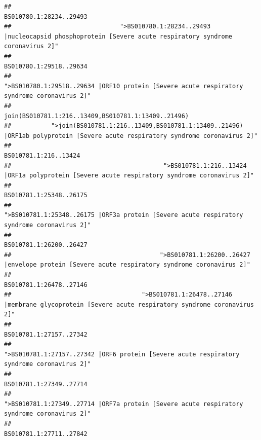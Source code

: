 \documentclass[
]{article}
\begin{document}
\begin{verbatim}
##                                                                                                                BS010780.1:28234..29493 
##                              ">BS010780.1:28234..29493 |nucleocapsid phosphoprotein [Severe acute respiratory syndrome coronavirus 2]" 
##                                                                                                                BS010780.1:29518..29634 
##                                            ">BS010780.1:29518..29634 |ORF10 protein [Severe acute respiratory syndrome coronavirus 2]" 
##                                                                                    join(BS010781.1:216..13409,BS010781.1:13409..21496) 
##           ">join(BS010781.1:216..13409,BS010781.1:13409..21496) |ORF1ab polyprotein [Severe acute respiratory syndrome coronavirus 2]" 
##                                                                                                                  BS010781.1:216..13424 
##                                          ">BS010781.1:216..13424 |ORF1a polyprotein [Severe acute respiratory syndrome coronavirus 2]" 
##                                                                                                                BS010781.1:25348..26175 
##                                            ">BS010781.1:25348..26175 |ORF3a protein [Severe acute respiratory syndrome coronavirus 2]" 
##                                                                                                                BS010781.1:26200..26427 
##                                         ">BS010781.1:26200..26427 |envelope protein [Severe acute respiratory syndrome coronavirus 2]" 
##                                                                                                                BS010781.1:26478..27146 
##                                    ">BS010781.1:26478..27146 |membrane glycoprotein [Severe acute respiratory syndrome coronavirus 2]" 
##                                                                                                                BS010781.1:27157..27342 
##                                             ">BS010781.1:27157..27342 |ORF6 protein [Severe acute respiratory syndrome coronavirus 2]" 
##                                                                                                                BS010781.1:27349..27714 
##                                            ">BS010781.1:27349..27714 |ORF7a protein [Severe acute respiratory syndrome coronavirus 2]" 
##                                                                                                                BS010781.1:27711..27842 

\end{verbatim}
\end{document}
